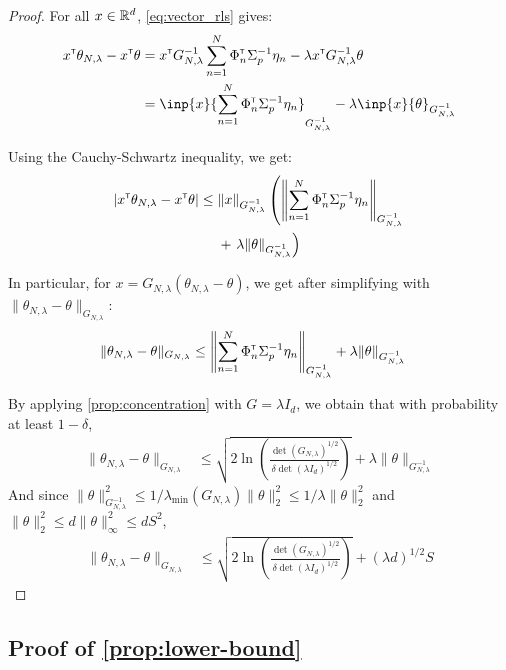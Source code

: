 \documentclass{article}
\begin{document}
\begin{proof}
For all $x\in\mathbb{R}^d$, \eqref{eq:vector_rls} gives:
\begin{align*}
    x^\transp\theta_{N,\lambda}  -x^\transp\theta &= x^\transp G_{N, \lambda}^{-1}\sum_{n=1}^N \Phi_n^\transp \Sigma_p^{-1}\eta_n
    - \lambda x^\transp G_{N, \lambda}^{-1}\theta\\
    &= \inp{x}{\sum_{n=1}^N \Phi_n^\transp \Sigma_p^{-1}\eta_n}_{G_{N, \lambda}^{-1}} - \lambda\inp{x}{\theta}_{G_{N, \lambda}^{-1}}
\end{align*}

Using the Cauchy-Schwartz inequality, we get:
\begin{align*}
    |x^{\mathsf{\scriptscriptstyle T}}\theta_{N,\lambda}  -x^{\mathsf{\scriptscriptstyle T}}\theta| \leq {} & \|x\|_{G_{N, \lambda}^{-1}}\left(\left\|\sum_{n=1}^N \Phi_n^{\mathsf{\scriptscriptstyle T}} \Sigma_p^{-1}\eta_n\right\|_{G_{N, \lambda}^{-1}}\right.\\ 
    &+ \left.\lambda\|\theta\|_{G_{N, \lambda}^{-1}}\right)
\end{align*}

In particular, for $x = G_{N,\lambda}(\theta_{N,\lambda} - \theta)$, we get after simplifying with $\| \theta_{N,\lambda}  - \theta\|_{G_{N,\lambda}}$:
\begin{align*}
    \| \theta_{N,\lambda}  - \theta\|_{G_{N,\lambda}} &\leq \left\|\sum_{n=1}^N \Phi_n^{\mathsf{\scriptscriptstyle T}} \Sigma_p^{-1}\eta_n\right\|_{G_{N, \lambda}^{-1}} + \lambda\|\theta\|_{G_{N, \lambda}^{-1}}
\end{align*}

By applying \autoref{prop:concentration} with $G=\lambda I_d$, we obtain that with probability at least $1-\delta$,
\begin{align*}
    \| \theta_{N,\lambda}  - \theta\|_{G_{N,\lambda}} &\leq \sqrt{2\ln \left(\frac{\det(G_{N,\lambda})^{1/2}}{\delta\det(\lambda I_d)^{1/2}}\right)}
     + \lambda\|\theta\|_{G_{N, \lambda}^{-1}}
\end{align*}
And since $\|\theta\|_{G_{N, \lambda}^{-1}}^2 \leq 1/\lambda_{\min}(G_{N,\lambda})\|\theta\|_2^2 \leq 1/\lambda \|\theta\|_2^2$ and $\|\theta\|_2^2 \leq d\|\theta\|_\infty^2\leq d S^2$,
\begin{align*}
    \| \theta_{N,\lambda}  - \theta\|_{G_{N,\lambda}} &\leq \sqrt{2\ln \left(\frac{\det(G_{N,\lambda})^{1/2}}{\delta\det(\lambda I_d)^{1/2}}\right)}
     + (\lambda d)^{1/2}S
\end{align*}
\end{proof}


\subsection{Proof of \autoref{prop:lower-bound}}
\end{document}
